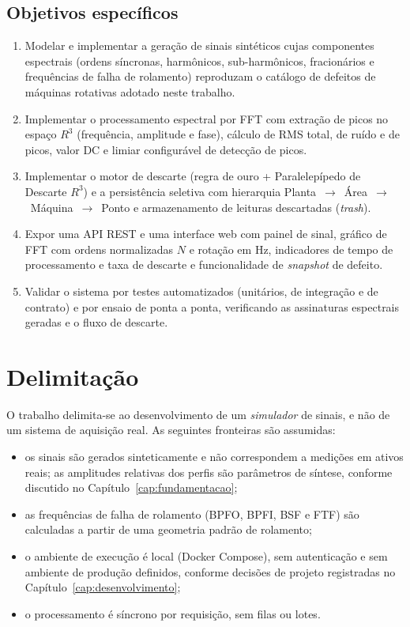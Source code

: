 \subsection{Objetivos específicos}

\begin{enumerate}
  \item Modelar e implementar a geração de sinais sintéticos cujas componentes
  espectrais (ordens síncronas, harmônicos, sub-harmônicos, fracionários e
  frequências de falha de rolamento) reproduzam o catálogo de defeitos de
  máquinas rotativas adotado neste trabalho.
  \item Implementar o processamento espectral por FFT com extração de picos no
  espaço \(R^3\) (frequência, amplitude e fase), cálculo de RMS total, de ruído
  e de picos, valor DC e limiar configurável de detecção de picos.
  \item Implementar o motor de descarte (regra de ouro + Paralelepípedo de
  Descarte \(R^3\)) e a persistência seletiva com hierarquia
  Planta~$\rightarrow$~Área~$\rightarrow$~Máquina~$\rightarrow$~Ponto e
  armazenamento de leituras descartadas (\emph{trash}).
  \item Expor uma API REST e uma interface web com painel de sinal, gráfico de
  FFT com ordens normalizadas \(N\) e rotação em Hz, indicadores de tempo de
  processamento e taxa de descarte e funcionalidade de \emph{snapshot} de
  defeito.
  \item Validar o sistema por testes automatizados (unitários, de integração e
  de contrato) e por ensaio de ponta a ponta, verificando as assinaturas
  espectrais geradas e o fluxo de descarte.
\end{enumerate}

\section{Delimitação}

O trabalho delimita-se ao desenvolvimento de um \emph{simulador} de sinais, e
não de um sistema de aquisição real. As seguintes fronteiras são assumidas:

\begin{itemize}
  \item os sinais são gerados sinteticamente e não correspondem a medições em
  ativos reais; as amplitudes relativas dos perfis são parâmetros de síntese,
  conforme discutido no Capítulo~\ref{cap:fundamentacao};
  \item as frequências de falha de rolamento (BPFO, BPFI, BSF e FTF) são
  calculadas a partir de uma geometria padrão de rolamento;
  \item o ambiente de execução é local (Docker Compose), sem autenticação e sem
  ambiente de produção definidos, conforme decisões de projeto registradas no
  Capítulo~\ref{cap:desenvolvimento};
  \item o processamento é síncrono por requisição, sem filas ou lotes.
\end{itemize}

